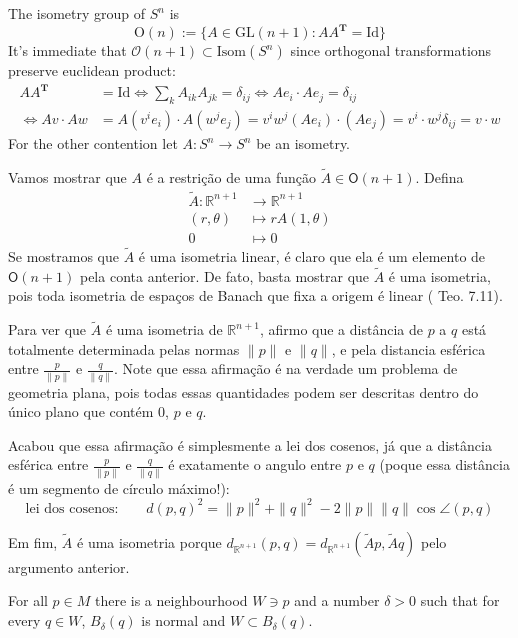 \documentclass{book}
\begin{document}
\begin{example}
\label{example-isometry-group-of-Sn}
The isometry group of $S^n$ is
$$
\text{O}(n):=\{A\in\text{GL}(n+1):
AA^{\mathbf{T}}=\text{Id}\}
$$
It's immediate that $\mathcal{O}(n+1)\subset
\text{Isom}(S^n)$ since orthogonal
transformations preserve euclidean product:
$$
\begin{aligned}
A A^{\mathbf{T}}&=\text{Id}\iff \sum_k
A_{ik}A_{jk}=\delta_{ij}
\iff Ae_i\cdot Ae_j=\delta_{ij}\\
\iff Av\cdot Aw&= A\left( v^ie_i\right) \cdot
A\left( w^je_j\right)
=v^iw^j (Ae_i)\cdot (Ae_j)
=v^i\cdot w^j\delta_{ij}=v\cdot w
\end{aligned}
$$
For the other contention let $A:S^n \to S^n$
be an isometry.

Vamos mostrar que $A$ é a restrição de uma
função $\tilde{A} \in
\mathsf{O}(n+1)$. Defina
$$
\begin{aligned}
\tilde{A}: \mathbb{R}^{n+1} &\longrightarrow
\mathbb{R}^{n+1} \\
(r,\theta) &\longmapsto rA(1,\theta)\\
0&\longmapsto 0
\end{aligned}
$$
Se mostramos que $\tilde{A}$ é uma isometria
linear, é claro que ela é um
elemento de $\mathsf{O}(n+1)$ pela conta
anterior. De fato, basta mostrar que
$\tilde{A}$ é uma isometria, pois toda
isometria de espaços de Banach que fixa
a origem é linear (\cite{braga} Teo. 7.11).

Para ver que $\tilde{A}$ é uma isometria de
$\mathbb{R}^{n+1}$,
afirmo que a distância de $p$ a $q$ está
totalmente determinada
pelas normas  $\|p\|$ e $\|q\|$, e pela
distancia esférica entre
$\frac{p}{\|p\|}$ e $\frac{q}{\|q\|}$. Note
que essa afirmação é na verdade
um problema de geometria plana, pois todas
essas quantidades podem ser descritas
dentro do único plano que contém $0$, $p$ e
$q$.

Acabou que essa afirmação é simplesmente a
lei dos cosenos, já que a distância
esférica entre $\frac{p}{\|p\|}$ e
$\frac{q}{\|q\|}$ é exatamente o angulo
entre $p$ e $q$ (poque essa distância é um
segmento de círculo máximo!):
\[\text{lei dos cosenos:} \qquad
d(p,q)^2=\|p\|^2+\|q\|^2-2\|p\|\|q\| \cos
\angle(p,q) \]

Em fim, $\tilde{A}$ é uma isometria porque
$d_{\mathbb{R}^{n+1}}(p,q)=d_{\mathbb{R}^{n+
1}}(\tilde{A}p,\tilde{A}q)$
pelo
argumento anterior.
\end{example}

\begin{proposition}
\label{proposition-total-norma-neigh}
For all $p \in M$ there is a neighbourhood $W
\ni p$ and a number $\delta>0$
 such that for every $q \in W$, $B_\delta(q)$
 is normal and
 $W \subset B_\delta(q)$.
\end{proposition}
\end{document}
